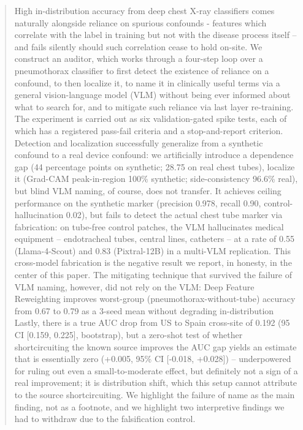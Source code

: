 \documentclass{ieeeaccess}
\begin{document}
\begin{abstract}
High in-distribution accuracy from deep chest X-ray classifiers comes naturally alongside
reliance on spurious confounds - features which correlate with the label in training but not with the disease process itself – and fails silently should such correlation cease to hold on-site. We construct an auditor, which works through a four-step loop over a pneumothorax classifier to first detect the existence of reliance on a confound, to then localize it, to name it in clinically useful terms via a general vision-language model (VLM) without being ever informed about what to search for, and to mitigate such reliance via last layer re-training. The experiment is carried out as six validation-gated spike tests, each of which has a registered pass-fail criteria and a stop-and-report criterion. Detection and localization successfully generalize from a synthetic confound to a real device confound: we artificially introduce a dependence gap (44 percentage points on synthetic; 28.75 on real chest tubes), localize it (Grad-CAM peak-in-region 100\% synthetic; side-consistency 96.6\% real), but blind VLM naming, of course,
does not transfer. It achieves ceiling performance on the synthetic marker (precision 0.978, recall 0.90, control-
hallucination 0.02), but fails to detect the actual chest tube marker via fabrication: on tube-free control patches, the VLM hallucinates medical equipment – endotracheal tubes, central lines, catheters – at a rate of 0.55 (Llama-4-Scout) and 0.83 (Pixtral-12B) in a multi-VLM replication. This cross-model fabrication is the negative result we report, in honesty, in the center of this paper. The mitigating technique that survived the failure of VLM naming, however, did not rely on the VLM:
Deep Feature Reweighting improves worst-group (pneumothorax-without-tube) accuracy from 0.67 to 0.79 as
a 3-seed mean without degrading in-distribution
Lastly, there is a true AUC drop from US to Spain cross-site of 0.192 (95%
CI [0.159, 0.225], bootstrap), but a zero-shot test of whether
shortcircuiting the known source improves the AUC gap yields an estimate that
is essentially zero (+0.005, 95\% CI [-0.018, +0.028]) – underpowered for
ruling out even a small-to-moderate effect, but definitely not a sign of a
real improvement; it is distribution shift, which this setup cannot attribute
to the source shortcircuiting. We highlight the failure of name as the main
finding, not as a footnote, and we highlight two interpretive findings we had
to withdraw due to the falsification control.
\end{abstract}
\end{document}
